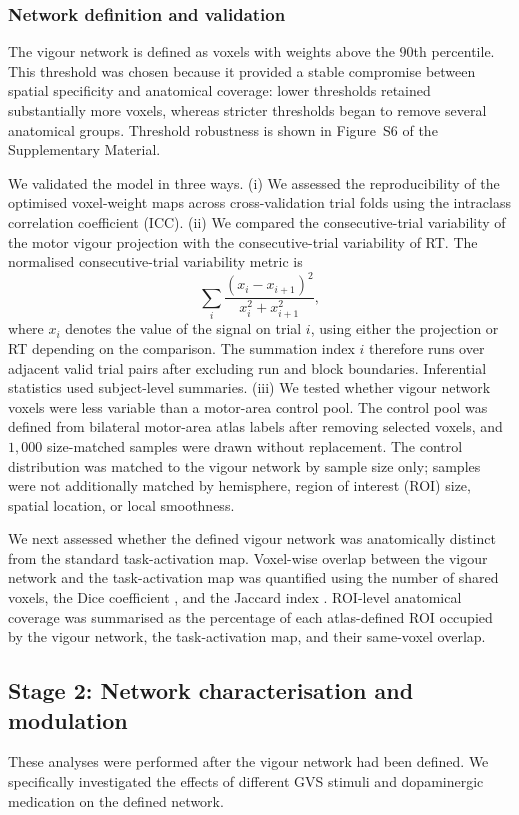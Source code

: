 \documentclass[utf8]{FrontiersinHarvard}
\begin{document}
\subsubsection{Network definition and validation}
The vigour network is defined as voxels with weights above the \(90\)th percentile. This threshold was chosen because it provided a stable compromise between spatial specificity and anatomical coverage: lower thresholds retained substantially more voxels, whereas stricter thresholds began to remove several anatomical groups. Threshold robustness is shown in Figure~S6 of the Supplementary Material.

We validated the model in three ways. (i) We assessed the reproducibility of the optimised voxel-weight maps across cross-validation trial folds using the intraclass correlation coefficient (ICC). (ii) We compared the consecutive-trial variability of the motor vigour projection with the consecutive-trial variability of RT. The normalised consecutive-trial variability metric is
\begin{equation}
\sum_i \frac{(x_i-x_{i+1})^2}{x_i^2+x_{i+1}^2},
\end{equation}
where \(x_i\) denotes the value of the signal on trial \(i\), using either the projection or RT depending on the comparison. The summation index \(i\) therefore runs over adjacent valid trial pairs after excluding run and block boundaries. Inferential statistics used subject-level summaries. (iii) We tested whether vigour network voxels were less variable than a motor-area control pool. The control pool was defined from bilateral motor-area atlas labels after removing selected voxels, and \(1{,}000\) size-matched samples were drawn without replacement. The control distribution was matched to the vigour network by sample size only; samples were not additionally matched by hemisphere, region of interest (ROI) size, spatial location, or local smoothness.

We next assessed whether the defined vigour network was anatomically distinct from the standard task-activation map. Voxel-wise overlap between the vigour network and the task-activation map was quantified using the number of shared voxels, the Dice coefficient \citep{elin2022new}, and the Jaccard index \citep{maitra2010re}. ROI-level anatomical coverage was summarised as the percentage of each atlas-defined ROI occupied by the vigour network, the task-activation map, and their same-voxel overlap.

\subsection{Stage 2: Network characterisation and modulation}
These analyses were performed after the vigour network had been defined. We specifically investigated the effects of different GVS stimuli and dopaminergic medication on the defined network.
\end{document}
